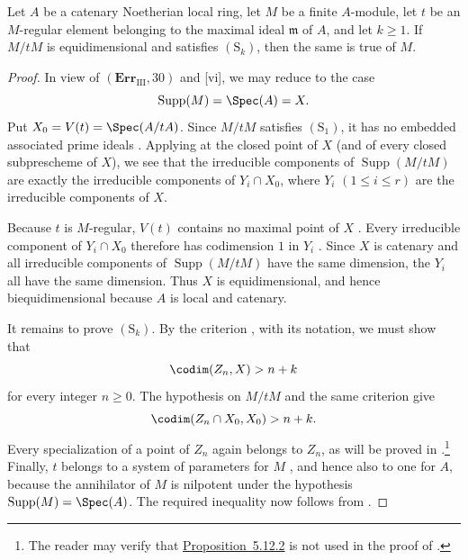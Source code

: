 \begin{proposition}[5.12.2]
\label{IV.5.12.2}
Let $A$ be a catenary Noetherian local ring, let $M$ be a finite
$A$-module, let $t$ be an $M$-regular element belonging to the
maximal ideal $\mathfrak m$ of $A$, and let $k\geq1$.  If $M/tM$
is equidimensional and satisfies $(\mathrm S_k)$, then the same is
true of $M$.
\end{proposition}

\begin{proof}
In view of $(\mathbf{Err}_{\mathrm{III}},30)$ and
[vi], we may reduce to the case
\[
  \operatorname{Supp}(M)=\Spec(A)=X.
\]
Put $X_0=V(t)=\Spec(A/tA)$.  Since $M/tM$ satisfies
$(\mathrm S_1)$, it has no embedded associated prime ideals
.  Applying  at the closed point of
$X$ (and of every closed subprescheme of $X$), we see that the
irreducible components of $\operatorname{Supp}(M/tM)$ are exactly
the irreducible components of $Y_i\cap X_0$, where
$Y_i$ $(1\leq i\leq r)$ are the irreducible components of $X$.

Because $t$ is $M$-regular, $V(t)$ contains no maximal point of
$X$ .  Every irreducible component of
$Y_i\cap X_0$ therefore has codimension $1$ in $Y_i$
.  Since $X$ is catenary and all irreducible
components of $\operatorname{Supp}(M/tM)$ have the same
dimension, the $Y_i$ all have the same dimension.  Thus $X$ is
equidimensional, and hence biequidimensional because $A$ is local
and catenary.

It remains to prove $(\mathrm S_k)$.  By the criterion
, with its notation, we must show that
\[
  \codim(Z_n,X)>n+k
\]
for every integer $n\geq0$.  The hypothesis on $M/tM$ and the same
criterion give
\[
  \codim(Z_n\cap X_0,X_0)>n+k.
\]
Every specialization of a point of $Z_n$ again belongs to $Z_n$,
as will be proved in .\footnote{The reader may
verify that {\hyperref[IV.5.12.2]{Proposition~5.12.2}} is not used in the proof of
.}  Finally, $t$ belongs to a system of
parameters for $M$ , and hence also to one for
$A$, because the annihilator of $M$ is nilpotent under the
hypothesis $\operatorname{Supp}(M)=\Spec(A)$.  The required
inequality now follows from .
\end{proof}

